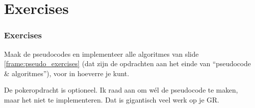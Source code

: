 \section{Exercises}

\begin{frame}
\frametitle{Exercises}

Maak de pseudocodes en implementeer alle algoritmes van slide \ref{frame:pseudo_exercises}
(dat zijn de opdrachten aan het einde van ``pseudocode \& algoritmes''), voor in hoeverre je kunt.

De pokeropdracht is optioneel. Ik raad aan om w\'el de pseudocode te maken, maar het niet te implementeren.
Dat is gigantisch veel werk op je GR.

\end{frame}

%
%


